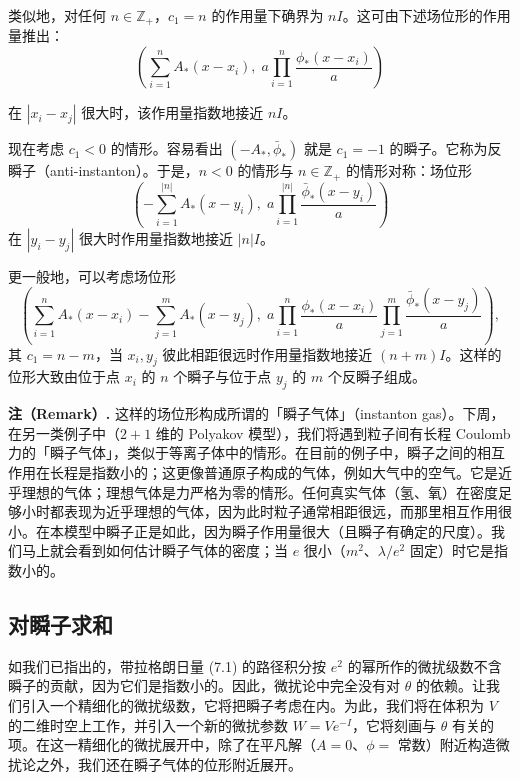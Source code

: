 类似地，对任何 $n\in\mathbb{Z}_+$，$c_1=n$ 的作用量下确界为 $nI$。这可由下述场位形的作用量推出：
\[
\left(\sum_{i=1}^{n}A_*(x-x_i),\; a\prod_{i=1}^{n}\frac{\phi_*(x-x_i)}{a}\right)
\]

在 $|x_i-x_j|$ 很大时，该作用量指数地接近 $nI$。

现在考虑 $c_1<0$ 的情形。容易看出 $(-A_*,\bar\phi_*)$ 就是 $c_1=-1$ 的瞬子。它称为反瞬子（anti-instanton）。于是，$n<0$ 的情形与 $n\in\mathbb{Z}_+$ 的情形对称：场位形
\[
\left(-\sum_{i=1}^{|n|}A_*(x-y_i),\; a\prod_{i=1}^{|n|}\frac{\bar\phi_*(x-y_i)}{a}\right)
\]
在 $|y_i-y_j|$ 很大时作用量指数地接近 $|n|I$。

更一般地，可以考虑场位形
\[
\left(\sum_{i=1}^{n}A_*(x-x_i)-\sum_{j=1}^{m}A_*(x-y_j),\; a\prod_{i=1}^{n}\frac{\phi_*(x-x_i)}{a}\prod_{j=1}^{m}\frac{\bar\phi_*(x-y_j)}{a}\right),
\]
其 $c_1=n-m$，当 $x_i,y_j$ 彼此相距很远时作用量指数地接近 $(n+m)I$。这样的位形大致由位于点 $x_i$ 的 $n$ 个瞬子与位于点 $y_j$ 的 $m$ 个反瞬子组成。

\textbf{注（Remark）.} 这样的场位形构成所谓的「瞬子气体」（instanton gas）。下周，在另一类例子中（$2+1$ 维的 Polyakov 模型），我们将遇到粒子间有长程 Coulomb 力的「瞬子气体」，类似于等离子体中的情形。在目前的例子中，瞬子之间的相互作用在长程是指数小的；这更像普通原子构成的气体，例如大气中的空气。它是近乎理想的气体；理想气体是力严格为零的情形。任何真实气体（氢、氧）在密度足够小时都表现为近乎理想的气体，因为此时粒子通常相距很远，而那里相互作用很小。在本模型中瞬子正是如此，因为瞬子作用量很大（且瞬子有确定的尺度）。我们马上就会看到如何估计瞬子气体的密度；当 $e$ 很小（$m^2$、$\lambda/e^2$ 固定）时它是指数小的。


\subsection{对瞬子求和}

如我们已指出的，带拉格朗日量 (7.1) 的路径积分按 $e^2$ 的幂所作的微扰级数不含瞬子的贡献，因为它们是指数小的。因此，微扰论中完全没有对 $\theta$ 的依赖。让我们引入一个精细化的微扰级数，它将把瞬子考虑在内。为此，我们将在体积为 $V$ 的二维时空上工作，并引入一个新的微扰参数 $W=Ve^{-I}$，它将刻画与 $\theta$ 有关的项。在这一精细化的微扰展开中，除了在平凡解（$A=0$、$\phi=$ 常数）附近构造微扰论之外，我们还在瞬子气体的位形附近展开。

